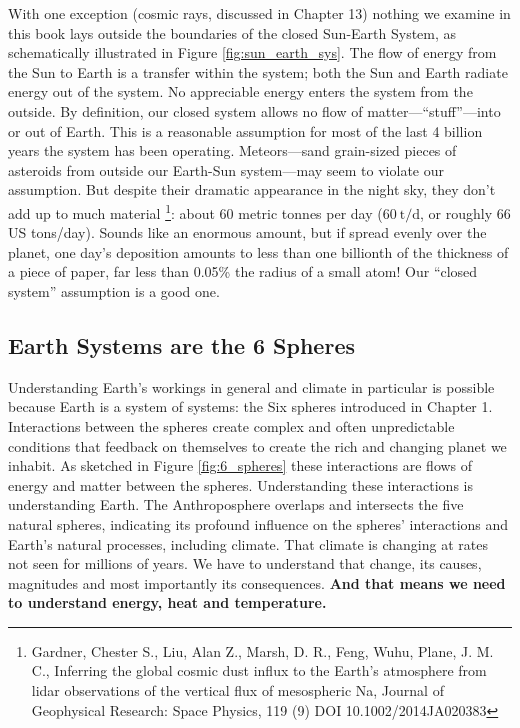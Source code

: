 \documentclass[amstex,12pt]{book}
\begin{document}
With one exception (cosmic rays, discussed in Chapter 13) nothing we examine in this book lays outside the boundaries of the closed Sun-Earth System, as schematically illustrated in Figure \ref{fig:sun_earth_sys}. The flow of energy from the Sun to Earth is a transfer within the system; both the Sun and Earth radiate energy out of the system. No appreciable energy enters the system from the outside. By definition, our closed system allows no flow of matter---``stuff''---into or out of Earth. This is a reasonable assumption for most of the last 4 billion years the system has been operating. Meteors---sand grain-sized pieces of asteroids from outside our Earth-Sun system---may seem to violate our assumption. But despite their dramatic appearance in the night sky, they don't add up to much material \footnote{Gardner, Chester S., Liu, Alan Z., Marsh, D. R., Feng, Wuhu, Plane, J. M. C., Inferring the global cosmic dust influx to the Earth's atmosphere from lidar observations of the vertical flux of mesospheric Na, Journal of Geophysical Research: Space Physics, 119 (9) DOI 10.1002/2014JA020383}: about 60 metric tonnes per day ($\SI{60}{\tonne\per\day}$, or roughly 66 US tons/day). Sounds like an enormous amount, but if spread evenly over the planet, one day's deposition amounts to less than one billionth of the thickness of a piece of paper, far less than 0.05\% the radius of a small atom! Our ``closed system'' assumption is a good one.

\subsection{Earth Systems are the 6 Spheres}
Understanding Earth's workings in general and climate in particular is possible because Earth is a system of systems: the Six spheres introduced in Chapter 1. Interactions between the spheres create complex and often unpredictable conditions that feedback on themselves to create the rich and changing planet we inhabit. As sketched in Figure \ref{fig:6_spheres} these interactions are flows of energy and matter between the spheres. Understanding these interactions is understanding Earth. The Anthroposphere overlaps and intersects the five natural spheres, indicating its profound influence on the spheres' interactions and Earth's natural processes, including climate. That climate is changing at rates not seen for millions of years. We have to understand that change, its causes, magnitudes and most importantly its consequences. \textbf{And that means we need to understand energy, heat and temperature.}
\end{document}

